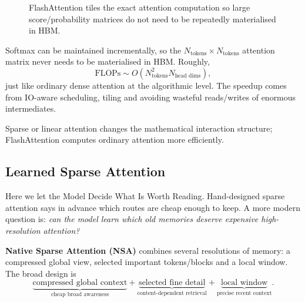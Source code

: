 \begin{figure}[htbp]
\centering
{}
\caption{FlashAttention tiles the exact attention computation so large score/probability matrices do not need to be repeatedly materialised in HBM.}
\label{fig:modern-flashattention-tiling}
\end{figure}

Softmax can be maintained incrementally, so the $N_{\text{tokens}}\times N_{\text{tokens}}$ attention matrix never needs to be materialised in HBM.
Roughly,
\[
\text{FLOPs}
\sim
O(N_{\text{tokens}}^2N_{\text{head dims}}),
\]
just like ordinary dense attention at the algorithmic level.
The speedup comes from IO-aware scheduling, tiling and avoiding wasteful reads/writes of enormous intermediates.

\begin{calloutmemoryhook}
Sparse or linear attention changes the mathematical interaction structure; FlashAttention computes ordinary attention more efficiently.
\end{calloutmemoryhook}

\subsection{Learned Sparse Attention}
Here we let the Model Decide What Is Worth Reading.
Hand-designed sparse attention says in advance which routes are cheap enough to keep.
A more modern question is: \textit{can the model learn which old memories deserve expensive high-resolution attention?}

\textbf{Native Sparse Attention (NSA)} combines several resolutions of memory: a compressed global view, selected important tokens/blocks and a local window.
The broad design is
\[
\underbrace{\text{compressed global context}}_{\text{cheap broad awareness}}
+
\underbrace{\text{selected fine detail}}_{\text{content-dependent retrieval}}
+
\underbrace{\text{local window}}_{\text{precise recent context}}.
\]

